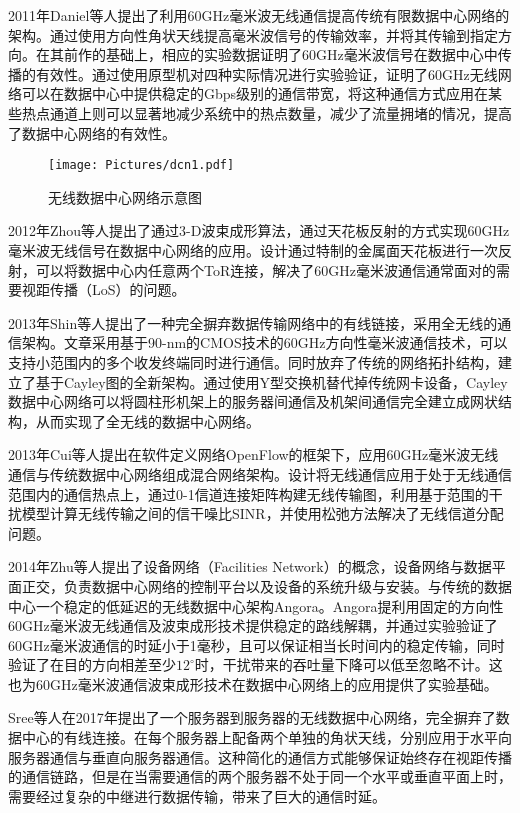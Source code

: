 2011年Daniel等人\cite{halperin2011augmenting}提出了利用60GHz毫米波无线通信提高传统有限数据中心网络的架构。通过使用方向性角状天线提高毫米波信号的传输效率，并将其传输到指定方向。在其前作\cite{kandula2009flyways}的基础上，相应的实验数据证明了60GHz毫米波信号在数据中心中传播的有效性。通过使用原型机对四种实际情况进行实验验证，证明了60GHz无线网络可以在数据中心中提供稳定的Gbps级别的通信带宽，将这种通信方式应用在某些热点通道上则可以显著地减少系统中的热点数量，减少了流量拥堵的情况，提高了数据中心网络的有效性。

\begin{figure}[htbp]
	\centering
	\texttt{[image: Pictures/dcn1.pdf]}
	\caption{无线数据中心网络示意图}
	\label{fig:dcn1}
\end{figure}

2012年Zhou等人提出了通过3-D波束成形算法，通过天花板反射的方式实现60GHz毫米波无线信号在数据中心网络的应用\cite{zhou2012mirror}。设计通过特制的金属面天花板进行一次反射，可以将数据中心内任意两个ToR连接，解决了60GHz毫米波通信通常面对的需要视距传播（LoS）的问题。

2013年Shin等人\cite{shin2013feasibility}提出了一种完全摒弃数据传输网络中的有线链接，采用全无线的通信架构。文章采用基于90-nm的CMOS技术\cite{pinel200960ghz}的60GHz方向性毫米波通信技术，可以支持小范围内的多个收发终端同时进行通信。同时放弃了传统的网络拓扑结构，建立了基于Cayley图\cite{prof1889theory}的全新架构。通过使用Y型交换机替代掉传统网卡设备，Cayley数据中心网络可以将圆柱形机架上的服务器间通信及机架间通信完全建立成网状结构，从而实现了全无线的数据中心网络。

2013年Cui等人提出在软件定义网络OpenFlow的框架下，应用60GHz毫米波无线通信与传统数据中心网络组成混合网络架构\cite{cui2013dynamic}。设计将无线通信应用于处于无线通信范围内的通信热点上，通过0-1信道连接矩阵构建无线传输图，利用基于范围的干扰模型计算无线传输之间的信干噪比SINR，并使用松弛方法解决了无线信道分配问题。

2014年Zhu等人提出了设备网络（Facilities Network）的概念，设备网络与数据平面正交，负责数据中心网络的控制平台以及设备的系统升级与安装。与传统的数据中心一个稳定的低延迟的无线数据中心架构\cite{zhu2014cutting}Angora。Angora提利用固定的方向性60GHz毫米波无线通信及波束成形技术提供稳定的路线解耦，并通过实验验证了60GHz毫米波通信的时延小于1毫秒，且可以保证相当长时间内的稳定传输，同时验证了在目的方向相差至少$12^{\circ}$时，干扰带来的吞吐量下降可以低至忽略不计。这也为60GHz毫米波通信波束成形技术在数据中心网络上的应用提供了实验基础。

Sree等人在2017年提出了一个服务器到服务器的无线数据中心网络\cite{umamaheswaran2017reducing}，完全摒弃了数据中心的有线连接。在每个服务器上配备两个单独的角状天线，分别应用于水平向服务器通信与垂直向服务器通信。这种简化的通信方式能够保证始终存在视距传播的通信链路，但是在当需要通信的两个服务器不处于同一个水平或垂直平面上时，需要经过复杂的中继进行数据传输，带来了巨大的通信时延。

